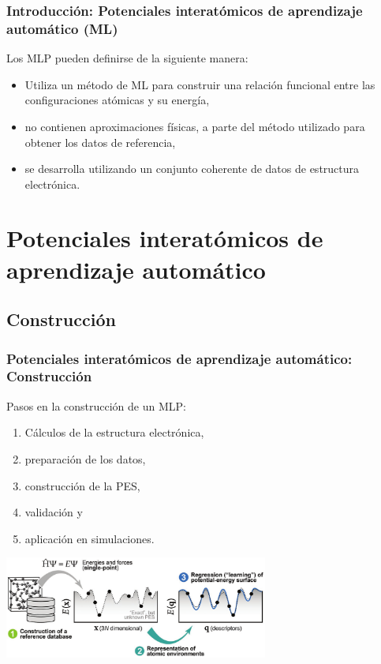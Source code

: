 \documentclass[aspectratio=169]{beamer}
\begin{document}
    \begin{frame}
        \frametitle{Introducción: Potenciales interatómicos de aprendizaje 
        automático (ML)}

        Los MLP pueden definirse de la siguiente manera:
        \begin{itemize}
            \item Utiliza un método de ML para construir una relación funcional
                entre las configuraciones atómicas y su energía,
            \item no contienen aproximaciones físicas, a parte del método 
                utilizado para obtener los datos de referencia,
            \item se desarrolla utilizando un conjunto coherente de datos de
                estructura electrónica.
        \end{itemize}

    \end{frame}

    \section{Potenciales interatómicos de aprendizaje automático}

    \subsection{Construcción}

    \begin{frame}
        \frametitle{Potenciales interatómicos de aprendizaje automático: Construcción}

        Pasos en la construcción de un MLP:
        \begin{enumerate}
            \item Cálculos de la estructura electrónica,
            \item preparación de los datos,
            \item construcción de la PES,
            \item validación y
            \item aplicación en simulaciones.
        \end{enumerate}

        \begin{center}
            \includegraphics[width=0.65\textwidth]{intro-construccion.png}
        \end{center}

	\end{frame}
    
\end{document}
